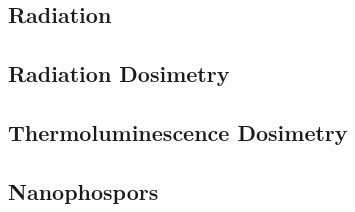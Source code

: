 \documentclass{article}[10pt]
\begin{document}
    \subsection{\large Radiation}

      
    
    \subsection{\large Radiation Dosimetry}
      

    \subsection{\large Thermoluminescence Dosimetry}
      

    \subsection{\large Nanophospors}
      
  
  \newpage
  
  
\end{document}
